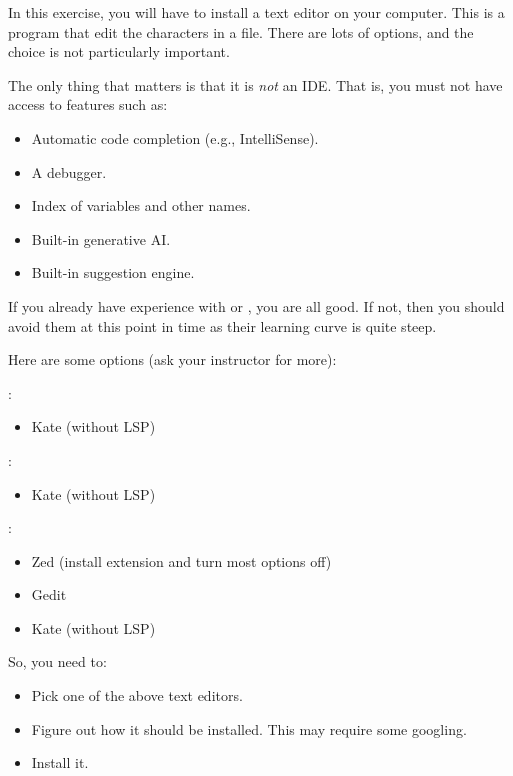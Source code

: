 In this exercise, you will have to install a text editor on your computer. This is a program that edit the characters in a file. There are lots of options, and the choice is not particularly important.

The only thing that matters is that it is \textsl{not} an IDE. That is, you must not have access to features such as:
\begin{itemize}
  \item Automatic code completion (e.g., IntelliSense).
  \item A debugger.
  \item Index of variables and other names.
  \item Built-in generative AI.
  \item Built-in suggestion engine.
\end{itemize}

If you already have experience with  or , you are all good. If not, then you should avoid them at this point in time as their learning curve is quite steep.

Here are some options (ask your instructor for more):

\begin{itemize}
  :
    \begin{itemize}
      \item Kate (without LSP)
    \end{itemize}
  :
    \begin{itemize}
      \item Kate (without LSP)
    \end{itemize}
  :
    \begin{itemize}
      \item Zed (install \csharp extension and turn most options off)
      \item Gedit
      \item Kate (without LSP)
    \end{itemize}
\end{itemize}

So, you need to:
\begin{itemize}
  \item Pick one of the above text editors.
  \item Figure out how it should be installed. This may require some googling.
  \item Install it.
\end{itemize}

